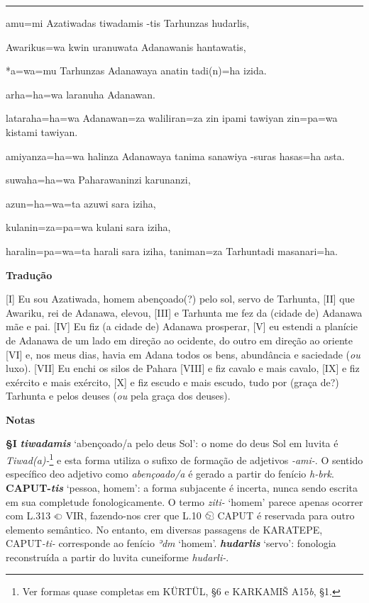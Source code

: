 \vspace{10pt}
\hrule
\vspace{10pt}


\setcounter{parcount}{0}
\begin{parnumbersr}

	\raggedright%
	\itshape%

	amu=mi Azatiwadas tiwadamis -tis Tarhunzas hudarlis,

	Awarikus=wa \lbreak{} kwin uranuwata Adanawanis hantawatis,

	*a=wa=mu Tarhunzas Adanawaya anatin tadi{(n)}=ha izida.

	arha=ha=wa laranuha Adanawan.

	lataraha=ha=wa Adanawan=za waliliran=za zin ipami tawiyan zin=pa=wa kistami
	tawiyan.

	amiyanza=ha=wa halinza Adanawaya tanima sanawiya -suras
	hasas=ha asta.

	suwaha=ha=wa Paharawaninzi karunanzi,

	azun=ha=wa=ta azuwi sara iziha,

	kulanin=za=pa=wa kulani sara iziha,

	haralin=pa=wa=ta harali sara iziha, taniman=za Tarhuntadi masanari=ha.


\end{parnumbersr}


\clearpage%
\noindent\textbf{Tradução}

[I] Eu sou Azatiwada, homem abençoado{(?)} pelo sol, servo de Tarhunta, [II] que
Awariku, rei de Adanawa, elevou, [III] e Tarhunta me fez da (cidade de)
Adanawa mãe e pai. [IV] Eu fiz (a cidade de) Adanawa prosperar, [V] eu estendi
a planície de Adanawa de um lado em direção ao ocidente, do outro em direção
ao oriente [VI] e, nos meus dias, havia em Adana todos os bens, abundância e
saciedade (\emph{ou} luxo). [VII] Eu enchi os silos de Pahara [VIII] e fiz
cavalo e mais cavalo, [IX] e fiz exército e mais exército, [X] e fiz escudo e
mais escudo, tudo por {(graça de?)} Tarhunta e pelos deuses (\emph{ou} pela
graça dos deuses).

\bigskip
\noindent\textbf{Notas}

\smallskip
\noindent\textbf{§I}\tabto{2em}
\textbf{\emph{tiwadamis}} `abençoado/a pelo deus Sol': o nome do deus Sol em
luvita é \emph{Tiwad{(a)}-}\footnote{Ver formas quase completas em KÜRTÜL, §6 e
	KARKAMIŠ A15\emph{b}, §1.} e esta forma utiliza o sufixo de formação de
adjetivos \emph{-ami-}.
O sentido específico deo adjetivo como \emph{abençoado/a} é gerado a partir do
fenício \emph{h-brk}.
\textbf{CAPUT-\emph{tis}} `pessoa, homem': a forma subjacente é incerta, nunca
sendo escrita em sua completude fonologicamente.
O termo \emph{ziti-} `homem' parece apenas ocorrer com L.313 𔕠 VIR, fazendo-nos
crer que L.10 𔐉 CAPUT é reservada para outro elemento semântico.
No entanto, em diversas passagens de KARATEPE, CAPUT\emph{-ti-} corresponde ao
fenício \emph{ʾdm} `homem'.
\textbf{\emph{hudarlis}} `servo': fonologia reconstruída a partir do
luvita cuneiforme \emph{hudarli-}.

